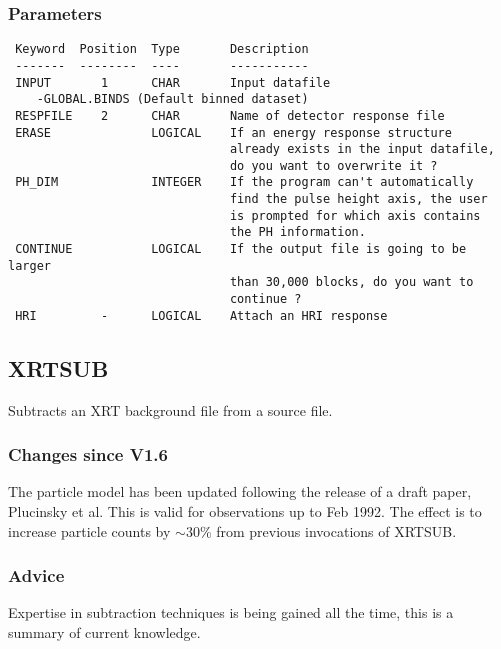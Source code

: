 \documentclass{book}
\renewcommand{\_}{{\tt\char'137}}     %
\begin{document}
\subsubsection{Parameters}
\begin{verbatim}
 Keyword  Position  Type       Description
 -------  --------  ----       -----------
 INPUT       1      CHAR       Input datafile
    -GLOBAL.BINDS (Default binned dataset)
 RESPFILE    2      CHAR       Name of detector response file
 ERASE              LOGICAL    If an energy response structure
                               already exists in the input datafile,
                               do you want to overwrite it ?
 PH_DIM             INTEGER    If the program can't automatically
                               find the pulse height axis, the user
                               is prompted for which axis contains
                               the PH information.
 CONTINUE           LOGICAL    If the output file is going to be larger
                               than 30,000 blocks, do you want to
                               continue ?
 HRI         -      LOGICAL    Attach an HRI response

\end{verbatim}\subsection{XRTSUB}
Subtracts an XRT background file from a source file.

\subsubsection{Changes since V1.6}
The particle model has been updated following the release of a draft paper,
Plucinsky et al. This is valid for observations up to Feb 1992.
The effect is to increase particle counts by $\sim$30\% from previous invocations
of XRTSUB.

\subsubsection{Advice}
Expertise in subtraction techniques is being gained all the time, this
is a summary of current knowledge.
\end{document}
